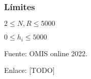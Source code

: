 \subsubsection*{Límites}
\begin{plimits}
	\item \(2\leq N, R \leq 5000\)
	\item \(0\leq h_i\leq 5000\)
\end{plimits}

Fuente: OMIS online 2022.

Enlace: [TODO]